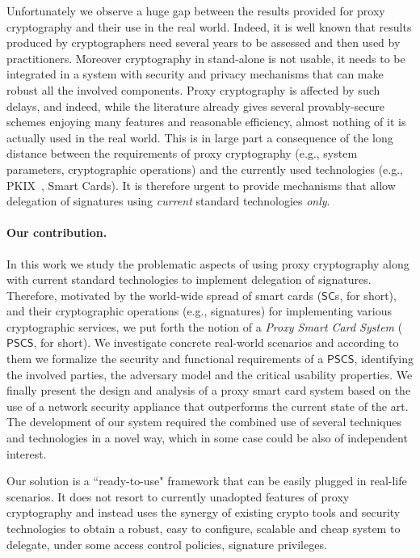 \documentclass[runningheads]{llncs}
\newcommand{\SC}{\ensuremath{\mathsf{SC}}}
\newcommand{\PSCS}{\ensuremath{\mathsf{PSCS}}}
\begin{document}
Unfortunately we observe a huge gap between the results provided for proxy cryptography and their use in the real world. Indeed, it is well known that results produced by cryptographers need several years to be assessed and then used by practitioners. Moreover cryptography in stand-alone is not usable, it needs to be integrated in a system with  security and privacy mechanisms that can make robust all the involved components. Proxy cryptography is affected by such delays, and indeed, while the literature already gives several provably-secure schemes enjoying many features and reasonable efficiency, almost nothing of it is actually used in the real world. This is in large part a consequence of the long distance between the requirements of proxy cryptography (e.g., system parameters, cryptographic operations) and the currently used technologies (e.g., PKIX~\cite{PKIX}, Smart Cards). It is therefore urgent to provide mechanisms that allow delegation of signatures using {\em current} standard technologies {\em only}.



\paragraph{Our contribution.}
In this work we study the problematic aspects of using proxy cryptography along with current standard technologies to implement delegation of signatures. Therefore, motivated by the world-wide spread of smart cards (\SC s, for short), and their cryptographic operations (e.g., signatures) for implementing various cryptographic services, we put forth the notion of a \emph{Proxy Smart Card System }(\PSCS, for short). We investigate concrete real-world scenarios and according to them we formalize the security and functional requirements of a \PSCS, identifying the involved parties, the adversary model and the critical usability properties. We finally present the design and analysis of a proxy smart card system based on the use of a network security appliance that outperforms the current state of the art. The development of our system required the combined use of several techniques and technologies in a novel way, which in some case could be also of independent interest.

Our solution is a ``ready-to-use" framework that can be easily plugged in real-life scenarios. It does not resort to currently unadopted features of proxy cryptography and instead uses the synergy of existing crypto tools and security technologies to obtain a robust, easy to configure, scalable and cheap system to delegate, under some access control policies, signature privileges.
\end{document}
